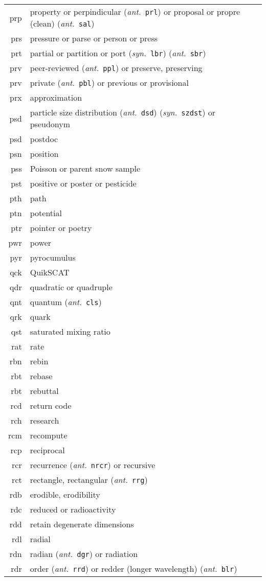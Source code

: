 \documentclass[12pt,twoside]{article}
\newcommand{\ant}[1]{(\textit{ant.}~\texttt{#1})}
\newcommand{\syn}[1]{(\textit{syn.}~\texttt{#1})}
\begin{document}
\begin{longtable}[>{\bfseries}l]{>{\ttfamily}r l}
prp & property or perpindicular \ant{prl} or proposal or propre (clean) \ant{sal} \\
prs & pressure or parse or person or press \\
prt & partial or partition or port \syn{lbr} \ant{sbr} \\
prv & peer-reviewed \ant{ppl} or preserve, preserving \\
prv & private \ant{pbl} or previous or provisional \\
prx & approximation \\
psd & particle size distribution \ant{dsd} \syn{szdst} or pseudonym \\
psd & postdoc \\
psn & position \\
pss & Poisson or parent snow sample \\
pst & positive or poster or pesticide \\
pth & path \\
ptn & potential \\
ptr & pointer or poetry \\
pwr & power \\
pyr & pyrocumulus \\
qck & QuikSCAT \\
qdr & quadratic or quadruple \\
qnt & quantum \ant{cls} \\
qrk & quark \\
qst & saturated mixing ratio \\
rat & rate \\
rbn & rebin \\
rbt & rebase \\
rbt & rebuttal \\
rcd & return code \\
rch & research \\
rcm & recompute \\
rcp & reciprocal \\
rcr & recurrence \ant{nrcr} or recursive \\
rct & rectangle, rectangular \ant{rrg} \\
rdb & erodible, erodibility \\
rdc & reduced or radioactivity \\
rdd & retain degenerate dimensions \\
rdl & radial \\
rdn & radian \ant{dgr} or radiation \\
rdr & order \ant{rrd} or redder (longer wavelength) \ant{blr} \\

\end{longtable}
\end{document}
